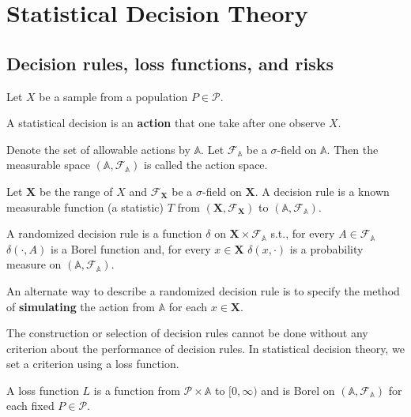 \section{Statistical Decision Theory}
\subsection{Decision rules, loss functions, and risks}
Let $X$ be a sample from a population $P\in\mathcal{P}$. 
\begin{definition}
A statistical decision is an \textbf{action} that one take after one observe $X$.
\end{definition}
\begin{definition}
Denote the set of allowable actions by $\mathbb{A}$. Let $\mathcal{F}_\mathbb{A}$ be a $\sigma$-field on $\mathbb{A}$. Then the measurable space $(\mathbb{A},\mathcal{F}_\mathbb{A})$ is called the action space.
\end{definition}
\begin{definition}
Let $\mathbf{X}$ be the range of $X$ and $\mathcal{F}_\mathbf{X}$ be a $\sigma$-field on $\mathbf{X}$. A decision rule is a known measurable function (a statistic) $T$ from $(\mathbf{X},\mathcal{F}_\mathbf{X})$ to $(\mathbb{A},\mathcal{F}_\mathbb{A})$.
\end{definition}
\begin{definition}
A randomized decision rule is a function $\delta$ on $\mathbf{X}\times\mathcal{F}_\mathbb{A}$ s.t., for every $A\in\mathcal{F}_\mathbb{A}$ $\delta(\cdot,A)$ is a Borel function and, for every $x\in\mathbf{X}$ $\delta(x,\cdot)$ is a probability measure on $(\mathbb{A},\mathcal{F}_\mathbb{A})$.
\end{definition}
\begin{remark}
An alternate way to describe a randomized decision rule is to specify the method of \textbf{simulating} the action from $\mathbb{A}$ for each $x\in\mathbf{X}$.
\end{remark}
The construction or selection of decision rules cannot be done without any criterion about the performance of decision rules. In statistical decision theory, we set a criterion using a loss function.
\begin{definition}
A loss function $L$ is a function from $\mathcal{P}\times\mathbb{A}$ to $[0,\infty)$ and is Borel on $(\mathbb{A},\mathcal{F}_\mathbb{A})$ for each fixed $P\in\mathcal{P}$.
\end{definition}
